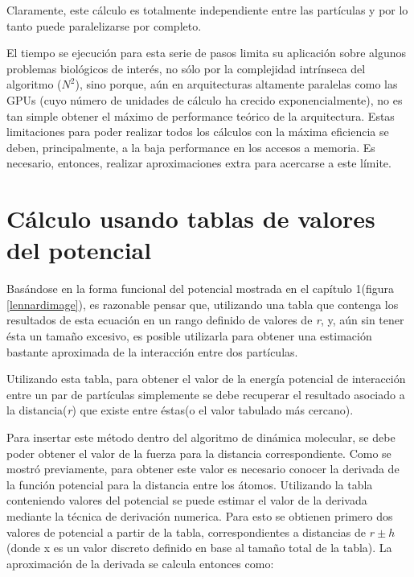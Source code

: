 Claramente, este cálculo es totalmente independiente entre las partículas y por lo tanto puede paralelizarse por completo.

El tiempo se ejecución para esta serie de pasos limita su aplicación sobre algunos problemas biológicos de interés, no sólo por la complejidad intrínseca del algoritmo ($N^2$), sino porque, aún en arquitecturas altamente paralelas como
las GPUs (cuyo número de unidades de cálculo ha crecido exponencialmente), no es tan simple obtener el máximo de performance teórico de la arquitectura. Estas limitaciones para poder realizar todos los cálculos con la máxima eficiencia se deben, principalmente,
a la baja performance en los accesos a memoria. Es necesario, entonces, realizar aproximaciones extra para acercarse a este límite.



\section{Cálculo usando tablas de valores del potencial }


Basándose en la forma funcional del potencial mostrada en el capítulo 1(figura \ref{lennardimage}), es razonable pensar que, utilizando una tabla que contenga los resultados de esta ecuación en un rango definido de valores de \textit{r}, y, 
aún sin tener ésta un tamaño excesivo, es posible utilizarla para obtener una estimación bastante aproximada de la interacción entre dos partículas. 

Utilizando esta tabla, para obtener el valor de la energía potencial de interacción entre un par de partículas simplemente se debe recuperar el resultado asociado a la distancia(\textit{r}) que existe entre éstas(o el valor tabulado más cercano).


Para insertar este método dentro del algoritmo de dinámica molecular, se debe poder obtener el valor de la fuerza para la distancia correspondiente.
Como se mostró previamente, para obtener este valor es necesario conocer la derivada de la función potencial para la distancia entre los átomos.
Utilizando la tabla conteniendo valores del potencial se puede estimar el valor de la derivada mediante la técnica de derivación numerica. 
Para esto se obtienen primero dos valores de potencial a partir de la tabla, correspondientes a distancias de $r\pm h$ (donde x es un valor discreto definido en base al tamaño total de la tabla).
La aproximación de la derivada se calcula entonces como:


